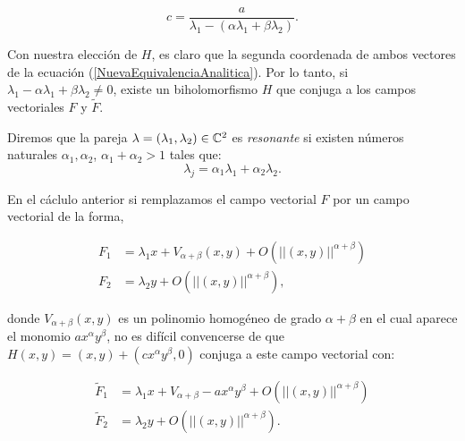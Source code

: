 \begin{equation}
c = \frac{a}{\lambda_{1} -(\alpha\lambda_{1} + \beta\lambda_{2})}.
\end{equation}

Con nuestra elección de $H$, es claro que la segunda coordenada de ambos vectores de la ecuación (\ref{NuevaEquivalenciaAnalitica}). Por lo tanto, si $\lambda_{1}-\alpha\lambda_{1}+\beta\lambda_{2}\neq 0$, existe un biholomorfismo $H$ que conjuga a los campos vectoriales $F$ y $\tilde{F}$.
\begin{defn}
\label{Def:Resonancias}
Diremos que la pareja $\lambda=(\lambda_{1},\lambda_{2})\in\mathbb{C}^{2}$ es \emph{resonante} si existen números naturales $\alpha_{1},\alpha_{2}$, $\alpha_{1}+\alpha_{2}>1$ tales que:
\begin{equation}
\label{Denominadores}
\lambda_{j}=\alpha_{1}\lambda_{1}+\alpha_{2}\lambda_{2}.
\end{equation}
\end{defn}

En el cáclulo anterior si remplazamos el campo vectorial $F$ por un campo vectorial de la forma,

\begin{equation}
\begin{aligned}
F_{1} &= \lambda_{1}x +V_{\alpha+\beta}(x,y)+O(||(x,y)||^{\alpha+\beta})\\
F_{2} &= \lambda_{2}y + O(||(x,y)||^{\alpha+\beta}),
\end{aligned}
\end{equation}

\noindent donde $V_{\alpha+\beta}(x,y)$ es un polinomio homogéneo de grado $\alpha+\beta$ en el cual aparece el monomio $ax^{\alpha}y^{\beta}$, no es difícil convencerse de que $H(x,y)=(x,y)+(cx^{\alpha}y^{\beta},0)$ conjuga a este campo vectorial con:
 
\begin{equation}
\begin{aligned}
\tilde{F}_{1} &= \lambda_{1}x + V_{\alpha+\beta}-ax^{\alpha}y^{\beta}+O(||(x,y)||^{\alpha+\beta})\\
\tilde{F}_{2} &= \lambda_{2}y + O(||(x,y)||^{\alpha+\beta}).
\end{aligned}
\end{equation}

